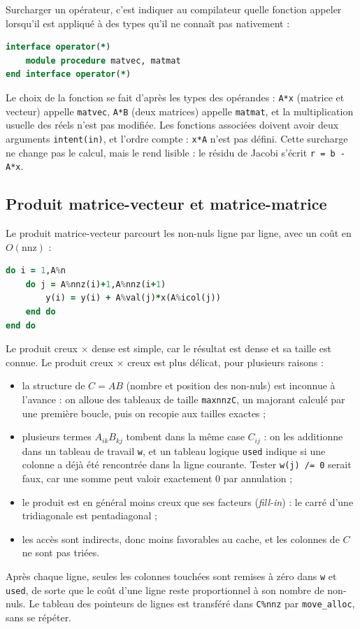 \documentclass[a4paper]{scrartcl}
\begin{document}
Surcharger un opérateur, c'est indiquer au compilateur quelle fonction appeler lorsqu'il est appliqué à 
des types qu'il ne connaît pas nativement :
\begin{lstlisting}[language=Fortran]
interface operator(*)
    module procedure matvec, matmat
end interface operator(*)
\end{lstlisting}
Le choix de la fonction se fait d'après les types des opérandes : \lstinline{A*x} (matrice et vecteur) appelle 
\lstinline{matvec}, \lstinline{A*B} (deux matrices) appelle \lstinline{matmat}, et la multiplication usuelle
des réels n'est pas modifiée. Les fonctions associées doivent avoir deux arguments \lstinline{intent(in)},
et l'ordre compte : \lstinline{x*A} n'est pas défini. Cette surcharge ne change pas le calcul, mais le rend lisible : 
le résidu de Jacobi s'écrit \lstinline{r = b - A*x}.

\subsection{Produit matrice-vecteur et matrice-matrice}

Le produit matrice-vecteur parcourt les non-nuls ligne par ligne, avec un coût en $O(\text{nnz})$ :
\begin{lstlisting}[language=Fortran]
do i = 1,A%n
    do j = A%nnz(i)+1,A%nnz(i+1)
        y(i) = y(i) + A%val(j)*x(A%icol(j))
    end do
end do
\end{lstlisting}

Le produit creux $\times$ dense est simple, car le résultat est dense et sa taille est connue. 
Le produit creux $\times$ creux est plus délicat, pour plusieurs raisons :
\begin{itemize}
\item la structure de $C=AB$ (nombre et position des non-nuls) est inconnue à l'avance : on alloue des tableaux de taille \lstinline{maxnnzC}, un majorant calculé par une première boucle, puis on recopie aux tailles exactes ;
\item plusieurs termes $A_{ik}B_{kj}$ tombent dans la même case $C_{ij}$ : on les additionne dans un tableau de travail \lstinline{w}, et un tableau logique \lstinline{used} indique si une colonne a déjà été rencontrée dans la ligne courante. Tester \lstinline{w(j) /= 0} serait faux, car une somme peut valoir exactement $0$ par annulation ;
\item le produit est en général moins creux que ses facteurs (\textit{fill-in}) : le carré d'une tridiagonale est pentadiagonal ;
\item les accès sont indirects, donc moins favorables au cache, et les colonnes de $C$ ne sont pas triées.
\end{itemize}
Après chaque ligne, seules les colonnes touchées sont remises à zéro dans \lstinline{w} et \lstinline{used}, 
de sorte que le coût d'une ligne reste proportionnel à son nombre de non-nuls. Le tableau des pointeurs de lignes est 
transféré dans \lstinline{C%nnz} par \lstinline{move_alloc}, sans se répéter. 
\end{document}
